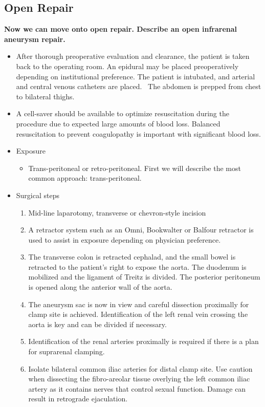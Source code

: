 \documentclass[
]{book}
\providecommand{\tightlist}{%
  \setlength{\itemsep}{0pt}\setlength{\parskip}{0pt}}
\begin{document}
\hypertarget{open-repair}{%
\subsection{Open Repair}\label{open-repair}}

\textbf{Now we can move onto open repair. Describe an open infrarenal aneurysm
repair.} \citep{mooreVascularEndovascularSurgery2019, garygwindAnatomicExposuresVascular2013}

\begin{itemize}
\item
  After thorough preoperative evaluation and clearance, the patient is
  taken back to the operating room. An epidural may be placed
  preoperatively depending on institutional preference. The patient is
  intubated, and arterial and central venous catheters are placed.~
  The abdomen is prepped from chest to bilateral thighs.
\item
  A cell-saver should be available to optimize resuscitation during
  the procedure due to expected large amounts of blood loss. Balanced
  resuscitation to prevent coagulopathy is important with significant
  blood loss.
\item
  Exposure

  \begin{itemize}
  \tightlist
  \item
    Trans-peritoneal or retro-peritoneal. First we will describe the
    most common approach: trans-peritoneal.
  \end{itemize}
\item
  Surgical steps

  \begin{enumerate}
  \def\labelenumi{\arabic{enumi}.}
  \item
    Mid-line laparotomy, transverse or chevron-style incision
  \item
    A retractor system such as an Omni, Bookwalter or Balfour
    retractor is used to assist in exposure depending on physician
    preference.
  \item
    The transverse colon is retracted cephalad, and the small bowel
    is retracted to the patient's right to expose the aorta. The
    duodenum is mobilized and the ligament of Treitz is divided. The
    posterior peritoneum is opened along the anterior wall of the
    aorta.
  \item
    The aneurysm sac is now in view and careful dissection
    proximally for clamp site is achieved. Identification of the
    left renal vein crossing the aorta is key and can be divided if
    necessary.
  \item
    Identification of the renal arteries proximally is required if
    there is a plan for suprarenal clamping.
  \item
    Isolate bilateral common iliac arteries for distal clamp site.
    Use caution when dissecting the fibro-areolar tissue overlying
    the left common iliac artery as it contains nerves that control
    sexual function. Damage can result in retrograde ejaculation.


\end{enumerate}
\end{itemize}
\end{document}

